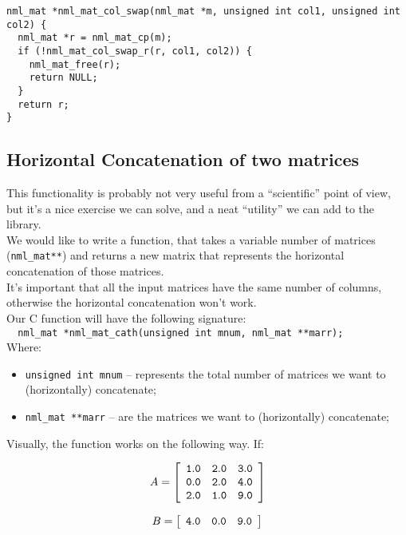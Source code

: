 \begin{verbatim}
nml_mat *nml_mat_col_swap(nml_mat *m, unsigned int col1, unsigned int col2) {
  nml_mat *r = nml_mat_cp(m);
  if (!nml_mat_col_swap_r(r, col1, col2)) {
    nml_mat_free(r);
    return NULL;
  }
  return r;
} 
\end{verbatim}

\subsection{Horizontal Concatenation of two matrices}

This functionality is probably not very useful from a ``scientific'' point of view, but it’s a nice exercise we can solve, and a neat ``utility'' we can add to the library.
\\

We would like to write a function, that takes a variable number of matrices ({\tt nml\_mat**}) and returns a new matrix that represents the horizontal concatenation of those matrices.
\\

It’s important that all the input matrices have the same number of columns, otherwise the horizontal concatenation won’t work.
\\

Our C function will have the following signature:
\\

\texttt{ \ nml\_mat *nml\_mat\_cath(unsigned int mnum, nml\_mat **marr);
}
\\

Where:

\begin{itemize}
\item {\tt unsigned int mnum} -- represents the total number of matrices we want to (horizontally) concatenate;
\item {\tt nml\_mat **marr} -- are the matrices we want to (horizontally) concatenate;
\end{itemize}

Visually, the function works on the following way. If:

$$
A = \left[
\begin{array}{rrr}
\tt 1.0 & \tt 2.0 & \tt 3.0 \\
\tt 0.0 & \tt 2.0 & \tt 4.0 \\
\tt 2.0 & \tt 1.0 & \tt 9.0
\end{array}
\right]
$$

$$
B = \left[
\begin{array}{rrr}
\tt 4.0 & \tt 0.0 & \tt 9.0
\end{array}
\right]
$$

